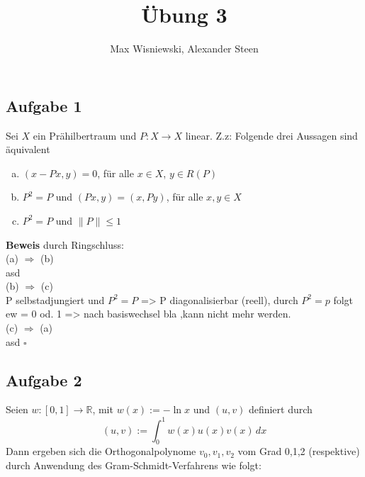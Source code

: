 \documentclass[11pt,a4paper,ngerman]{article}
\date{}
\title{Übung 3}
\author{Max Wisniewski, Alexander Steen}
\begin{document}

\renewcommand{\figurename}{Figure}

\maketitle
\thispagestyle{fancy}

\subsection*{Aufgabe 1}
Sei $X$ ein Prähilbertraum und $P: X \to X$ linear. Z.z: Folgende drei Aussagen sind äquivalent
\begin{enumerate}[(a)]
\item $(x-Px,y) = 0$, für alle $x \in X$, $y \in R(P)$ 
\item $P^2 = P$ und $(Px,y) = (x,Py)$, für alle $x,y \in X$ 
\item $P^2 = P$ und $\|P\| \leq 1$
\end{enumerate}
\textbf{Beweis} durch Ringschluss:\\
(a) $\Rightarrow$ (b) \\
asd \\
(b) $\Rightarrow$ (c) \\
P selbstadjungiert und $P^2 = P$ => P diagonalisierbar (reell), durch $P^2 = p$ folgt ew = 0 od. 1 => nach basiswechsel bla ,kann nicht mehr werden. \\
(c) $\Rightarrow$ (a) \\
asd 
\mbox{} \hfill $\square$

\subsection*{Aufgabe 2}
Seien $w: [0,1] \to \mathbb{R}$, mit $w(x) := - \ln x$ und $(u,v)$ definiert durch
$$ (u,v) := \int_0^1 w(x)u(x)v(x) \, dx $$
Dann ergeben sich die Orthogonalpolynome $v_0,v_1,v_2$ vom Grad 0,1,2 (respektive) durch Anwendung
des Gram-Schmidt-Verfahrens wie folgt: \\
\end{document}
